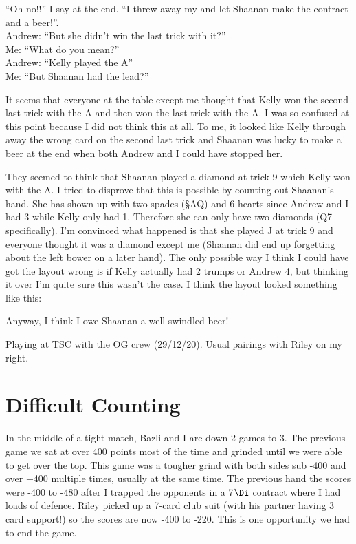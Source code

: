 \documentclass[a4paper]{JoshCards}
\begin{document}
``Oh no!!'' I say at the end. ``I threw away my  and let Shaanan make the contract and a beer!''.\\
Andrew: ``But she didn't win the last trick with it?''\\ 
Me: ``What do you mean?''\\
Andrew: ``Kelly played the \C A''\\
Me: ``But Shaanan had the lead?''

It seems that everyone at the table except me thought that Kelly won the second last trick with the \D A and then won the last trick with the \C A. I was so confused at this point because I did not think this at all. To me, it looked like Kelly through away the wrong card on the second last trick and Shaanan was lucky to make a beer at the end when both Andrew and I could have stopped her. 

They seemed to think that Shaanan played a diamond at trick 9 which Kelly won with the \D A. I tried to disprove that this is possible by counting out Shaanan's hand. She has shown up with two spades (\S AQ) and 6 hearts since Andrew and I had 3 while Kelly only had 1. Therefore she can only have two diamonds (\D Q7 specifically). I'm convinced what happened is that she played \D J at trick 9 and everyone thought it was a diamond except me (Shaanan did end up forgetting about the left bower on a later hand). The only possible way I think I could have got the layout wrong is if Kelly actually had 2 trumps or Andrew 4, but thinking it over I'm quite sure this wasn't the case. I think the layout looked something like this:

\gamefont{\larger}
\leftupper{}%
{}{}
\rightupper{\contract:
7\He}{\declarer: \east}{}
\rightlower{}{}{}
\showAll*
Anyway, I think I owe Shaanan a well-swindled beer!




\newpage

Playing at TSC with the OG crew (29/12/20). Usual pairings with Riley on my right.

\section*{Difficult Counting}

In the middle of a tight match, Bazli and I are down 2 games to 3. The previous game we sat at over 400 points most of the time and grinded until we were able to get over the top. This game was a tougher grind with both sides sub -400 and over +400 multiple times, usually at the same time. The previous hand the scores were -400 to -480 after I trapped the opponents in a 7$\Di$ contract where I had loads of defence. Riley picked up a 7-card club suit (with his partner having 3 card support!) so the scores are now -400 to -220. This is one opportunity we had to end the game.
\end{document}
